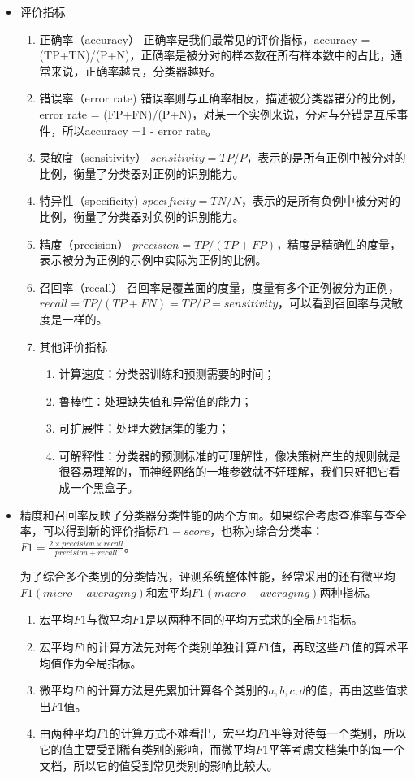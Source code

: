 \begin{itemize}
\item 评价指标
	\begin{enumerate}
			\itemsep0em 
		\item 正确率（accuracy） 正确率是我们最常见的评价指标，accuracy = (TP+TN)/(P+N)，正确率是被分对的样本数在所有样本数中的占比，通常来说，正确率越高，分类器越好。
		\item 错误率（error rate) 错误率则与正确率相反，描述被分类器错分的比例，error rate = (FP+FN)/(P+N)，对某一个实例来说，分对与分错是互斥事件，所以accuracy =1 -  error rate。
		\item 灵敏度（sensitivity） $sensitivity = TP/P$，表示的是所有正例中被分对的比例，衡量了分类器对正例的识别能力。
		\item 特异性（specificity) $specificity = TN/N$，表示的是所有负例中被分对的比例，衡量了分类器对负例的识别能力。
		\item 精度（precision） $precision=TP/(TP+FP)$，精度是精确性的度量，表示被分为正例的示例中实际为正例的比例。
		\item 召回率（recall） 召回率是覆盖面的度量，度量有多个正例被分为正例，$recall=TP/(TP+FN)=TP/P=sensitivity$，可以看到召回率与灵敏度是一样的。
		\item 其他评价指标
			\begin{enumerate}
					\itemsep0em 
				\item 计算速度：分类器训练和预测需要的时间；
				\item 鲁棒性：处理缺失值和异常值的能力；
				\item 可扩展性：处理大数据集的能力；
				\item 可解释性：分类器的预测标准的可理解性，像决策树产生的规则就是很容易理解的，而神经网络的一堆参数就不好理解，我们只好把它看成一个黑盒子。
			\end{enumerate}
	\end{enumerate}

\item 精度和召回率反映了分类器分类性能的两个方面。如果综合考虑查准率与查全率，可以得到新的评价指标$F1-score$，也称为综合分类率：$F1=\frac{2 \times precision \times recall}{precision + recall}$。

		为了综合多个类别的分类情况，评测系统整体性能，经常采用的还有微平均$F1(micro-averaging)$和宏平均$F1(macro-averaging)$两种指标。

		\begin{enumerate}
			\itemsep0em 
			\item 宏平均$F1$与微平均$F1$是以两种不同的平均方式求的全局$F1$指标。
			\item 宏平均$F1$的计算方法先对每个类别单独计算$F1$值，再取这些$F1$值的算术平均值作为全局指标。
			\item 微平均$F1$的计算方法是先累加计算各个类别的$a,b,c,d$的值，再由这些值求出$F1$值。
			\item 由两种平均$F1$的计算方式不难看出，宏平均$F1$平等对待每一个类别，所以它的值主要受到稀有类别的影响，而微平均$F1$平等考虑文档集中的每一个文档，所以它的值受到常见类别的影响比较大。
		\end{enumerate}


\end{itemize}
